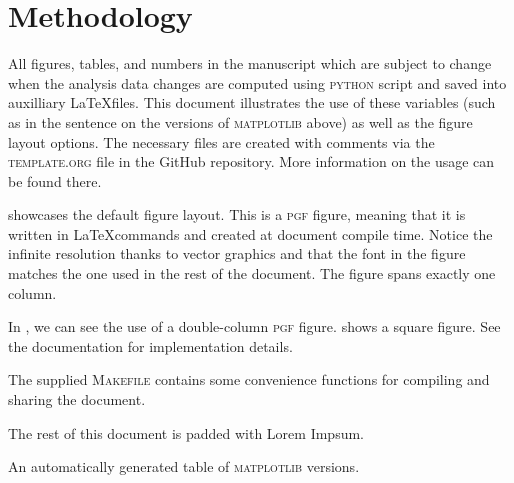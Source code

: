 
\section{Methodology}%
\label{sec:methodology}%

All figures, tables, and numbers in the manuscript which are subject
to change when the analysis data changes are computed using
\textsc{python} script and saved into auxilliary \LaTeX files. This
document illustrates the use of these variables (such as in the
sentence on the versions of \textsc{matplotlib} above) as well as the
figure layout options.
The necessary files are created with comments via the
\textsc{template.org} file in the GitHub repository. More information
on the usage can be found there.

 showcases the default figure
layout. This is a \textsc{pgf} figure, meaning that it is written in
\LaTeX commands and created at document compile time. Notice the
infinite resolution thanks to vector graphics and that the font in the
figure matches the one used in the rest of the document. The figure
spans exactly one column.

In , we can see the use of a double-column \textsc{pgf} figure.
 shows a square figure. See the
documentation for implementation details.

The supplied \textsc{Makefile} contains some convenience functions for
compiling and sharing the document. 

The rest of this document is padded with Lorem Impsum.

\lipsum

\begin{table}[t]
\caption{An automatically generated table of \textsc{matplotlib} versions.}
\label{tab:matplotlib_versions}

\end{table}
\lipsum[3-5]


